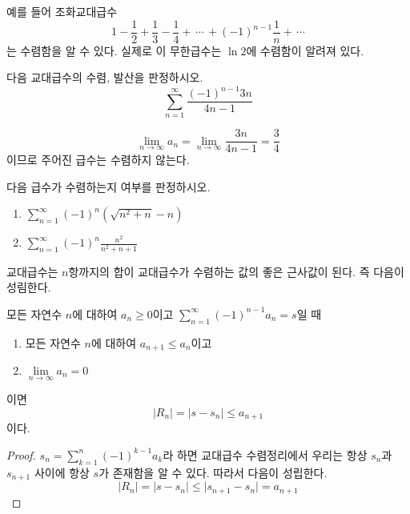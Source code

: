 \documentclass[11pt, a4paper]{book}
\begin{document}
예를 들어 {\color{red}조화교대급수}
\begin{equation*}
	1-\frac{1}{2} + \frac{1}{3} - \frac{1}{4} + \, \cdots \, + (-1)^{n-1}\frac{1}{n} + \, \cdots
\end{equation*}
는 수렴함을 알 수 있다. 실제로 이 무한급수는 $\ln 2$에 수렴함이 알려져 있다.
\vspace{1em}
\begin{example}
	다음 교대급수의 수렴, 발산을 판정하시오.
	\begin{equation*}
		\sum_{n=1}^{\infty} \frac{(-1)^{n-1}3n}{4n-1}
	\end{equation*}
\begin{solution}
	\begin{equation*}
		\lim\limits_{n\to \infty}a_{n} =\lim\limits_{n\to \infty}\frac{3n}{4n-1} =\frac{3}{4}
	\end{equation*}
이므로 주어진 급수는 수렴하지 않는다.
\end{solution}
\end{example}
\vspace{1em}
\begin{problem}
	다음 급수가 수렴하는지 여부를 판정하시오.
	\begin{enumerate}[label=(\arabic*)]
		\item $\displaystyle \sum_{n=1}^{\infty}(-1)^{n}\left(\sqrt{n^{2}+n}-n\right)$
		\item $\displaystyle \sum_{n=1}^{\infty}(-1)^{n}\frac{n^2}{n^2 +n+1}$
	\end{enumerate}
\end{problem}

교대급수는 $n$항까지의 합이 교대급수가 수렴하는 값의 좋은 근사값이 된다. 즉 다음이 성림한다.
\vspace{1em}
\begin{theorem}
	모든 자연수 $n$에 대하여 $a_{n} \ge 0$이고 $\displaystyle \sum_{n=1}^{\infty}(-1)^{n-1}a_n =s$일 때
	\begin{enumerate}[label=\arabic*)]
		\item 모든 자연수 $n$에 대하여 $a_{n+1} \le a_n$이고
		\item $\lim\limits_{n\to\infty}a_{n}=0$
	\end{enumerate}
	이면 
	\begin{equation*}
		\vert R_{n} \vert= \vert s - s_n \vert \le a_{n+1}
	\end{equation*}
이다.
\end{theorem}
\begin{proof}
	$s_n = \displaystyle \sum_{k=1}^{n}(-1)^{k-1}a_{k}$라 하면 
	교대급수 수렴정리에서 우리는 항상 $s_n$과 $s_{n+1}$ 사이에 항상 $s$가 존재함을 알 수 있다. 따라서 다음이 성립한다.
	\begin{equation*}
			\vert R_{n} \vert = \vert s - s_n \vert \le \vert s_{n+1} -s_{n}\vert = a_{n+1}
	\end{equation*}
\end{proof}
\end{document}
